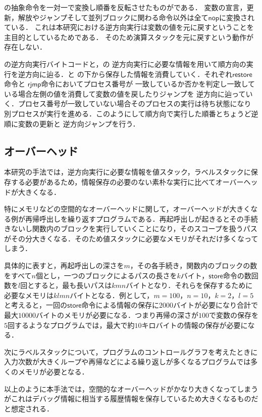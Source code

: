 \documentclass[submit,PRO]{ipsj}
\newcommand{\bcode}[1]{$\mathsf{#1}$}
\begin{document}
の抽象命令を一対一で変換し順番を反転させたものがである．
変数の宣言，更新，解放やジャンプそして並列ブロックに関わる命令以外は全て\bcode{nop}に変換されている．
これは本研究における逆方向実行は変数の値を元に戻すということを主目的としているためである．
そのため演算スタックを元に戻すという動作が存在しない．

の逆方向実行バイトコードと，の
逆方向実行に必要な情報を用いて順方向の実行を逆方向に辿る．と
の下から保存した情報を消費していく．それぞれ\bcode{restore}命令と
\bcode{rjmp}命令においてプロセス番号が
一致しているか否かを判定し一致している場合左側の値を消費して変数の値を戻したりジャンプを
逆方向に辿っていく．プロセス番号が一致していない場合そのプロセスの実行は待ち状態になり
別プロセスが実行を進める．このようにして順方向で実行した順番とちょうど逆順に変数の更新と
逆方向ジャンプを行う．

\subsection{オーバーヘッド}

本研究の手法では，逆方向実行に必要な情報を値スタック，ラベルスタックに保存する必要があるため，情報保存の必要のない素朴な実行に比べてオーバーヘッドが大きくなる．

特にメモリなどの空間的なオーバーヘッドに関して，オーバーヘッドが大きくなる例が再帰呼出しを繰り返すプログラムである．再起呼出しが起きるとその手続きないし関数内のブロックを実行していくことになり，そのスコープを扱うパスがその分大きくなる．そのため値スタックに必要なメモリがそれだけ多くなってしまう．

具体的に表すと，再起呼出しの深さを$m$，その各手続き，関数内のブロックの数をすべて$n$個とし，一つのブロックによるパスの長さを$k$バイト，\bcode{store}命令の数回数を$l$回とすると，最も長いパスは$kmn$バイトとなり．それらを保存するために必要なメモリは$klmn$バイトとなる．例として，$m=100$，$n=10$，$k=2$，$l=5$と考えると，一回の\bcode{store}命令による情報の保存に$2000$バイトが必要になり合計で最大$10000$バイトのメモリが必要になる．つまり再帰の深さが$100$で変数の保存を$5$回するようなプログラムでは，最大で約$10$キロバイトの情報の保存が必要になる．

次にラベルスタックについて，プログラムのコントロールグラフを考えたときに入力次数が大きくループや再帰などによる繰り返しが多くなるプログラムでは多くのメモリが必要となる．

以上のように本手法では，空間的なオーバーヘッドがかなり大きくなってしまうがこれはデバッグ情報に相当する履歴情報を保存しているため大きくなるものだと想定される．
\end{document}
